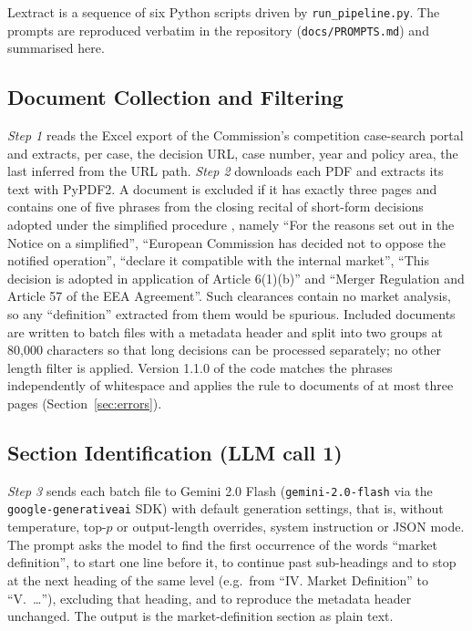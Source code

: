 \documentclass{IOS-Book-Article}
\begin{document}
Lextract is a sequence of six Python scripts driven by \texttt{run\_pipeline.py}.
The prompts are reproduced verbatim in the repository
(\texttt{docs/PROMPTS.md}) and summarised here.

\subsection{Document Collection and Filtering}

\emph{Step 1} reads the Excel export of the Commission's competition case-search
portal and extracts, per case, the decision URL, case number, year and policy
area, the last inferred from the URL path. \emph{Step 2} downloads each PDF and
extracts its text with PyPDF2. A document is excluded if it has exactly three
pages and contains one of five phrases from the closing recital of short-form
decisions adopted under the simplified procedure \cite{simplified2013}, namely
``For the reasons set out in the Notice on a simplified'', ``European Commission
has decided not to oppose the notified operation'', ``declare it compatible with
the internal market'', ``This decision is adopted in application of Article
6(1)(b)'' and ``Merger Regulation and Article 57 of the EEA Agreement''. Such
clearances contain no market analysis, so any ``definition'' extracted from them
would be spurious. Included documents are written to batch files with a
metadata header and split into two groups at 80,000 characters so that long
decisions can be processed separately; no other length filter is applied.
Version 1.1.0 of the code matches the phrases independently of whitespace and
applies the rule to documents of at most three pages (Section~\ref{sec:errors}).

\subsection{Section Identification (LLM call 1)}

\emph{Step 3} sends each batch file to Gemini 2.0 Flash
(\texttt{gemini-2.0-flash} via the \texttt{google-generativeai} SDK) with
default generation settings, that is, without temperature, top-$p$ or
output-length overrides, system instruction or JSON mode. The prompt asks the
model to find the first occurrence of the words ``market definition'', to start
one line before it, to continue past sub-headings and to stop at the next
heading of the same level (e.g.\ from ``IV. Market Definition'' to
``V.~\ldots''), excluding that heading, and to reproduce the metadata header
unchanged. The output is the market-definition section as plain text.
\end{document}

